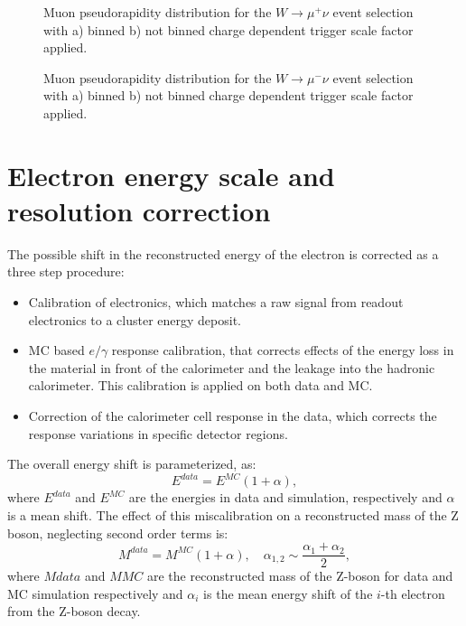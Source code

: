 \begin{figure}[!tbp]
\endminipage\hfill
{}
\endminipage\hfill
\caption{Muon pseudorapidity distribution for the $W\to \mu^{+} \nu$  event selection with  a) binned  b) not binned charge dependent trigger scale factor applied.}
\label{fig:SFBined2}
\end{figure}

\begin{figure}[!tbp]
\endminipage\hfill
{}
\endminipage\hfill
\caption{Muon pseudorapidity distribution for the $W\to \mu^{-} \nu$  event selection with a) binned  b) not binned charge dependent trigger scale factor applied.}
\label{fig:SFBined3}
\end{figure}

\section{Electron energy scale and resolution correction}\label{sec:elecScale}
The possible shift in the reconstructed energy of the electron is corrected as a three step procedure\cite{ElecCalib}:
\begin{itemize}
\item Calibration of electronics, which matches a raw signal from readout electronics to a cluster energy deposit.
\item MC based $e/\gamma$ response calibration, that corrects effects of the energy loss in the material in front of the calorimeter and the leakage into the hadronic calorimeter. This calibration is applied on both data and MC.
\item Correction of the calorimeter cell response in the data, which corrects the  response variations in specific detector regions.
\end{itemize}

The overall energy shift is parameterized, as:
\begin{equation}
E^{data}=E^{MC}(1+\alpha),
\end{equation}
where $E^{data}$ and $E^{MC}$ are the energies in data and simulation, respectively and $\alpha$ is a mean shift. The effect of this miscalibration on a reconstructed mass of the Z boson, neglecting second order terms is:
\begin{equation}
M^{data}=M^{MC}(1+\alpha), \quad \alpha_{1,2} \sim \frac{\alpha_1+\alpha_2}{2}, 
\end{equation}
where $M{data}$ and $M{MC}$ are the reconstructed mass of the Z-boson for data and MC simulation respectively and $\alpha_i$ is the mean energy shift of the $i$-th electron from the Z-boson decay. 

